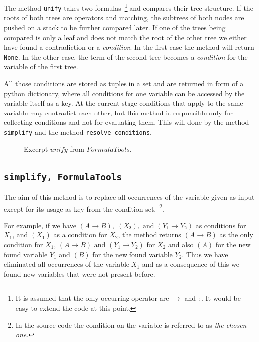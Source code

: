 The method \texttt{unify} takes two formulas~\footnote{It is assumed that the only occurring operator are $\rightarrow$ and $:$. It would be easy to extend the code at this point.} and compares their tree structure. If the roots of both trees are operators and matching, the subtrees of both nodes are pushed on a stack to be further compared later. If one of the trees being compared is only a leaf and does not match the root of the other tree we either have found a contradiction or a \emph{condition}. In the first case the method will return \texttt{None}. In the other case, the term of the second tree becomes a \emph{condition} for the variable of the first tree.

All those conditions are stored as tuples in a set and are returned in form of a python dictionary, where all conditions for one variable can be accessed by the variable itself as a key. At the current stage conditions that apply to the same variable may contradict each other, but this method is responsible only for collecting conditions and not for evaluating them. This will done by the method \texttt{simplify} and the method \texttt{resolve\_conditions}.

\begin{figure}[H]
	\vspace{-10pt}
	
	\vspace{-10pt}
	\caption{Excerpt $unify$ from $FormulaTools$.}
\end{figure}


\subsection[simplify]{\texttt{simplify, FormulaTools}}

The aim of this method is to replace all occurrences of the variable given as input except for its usage as key from the condition set.~\footnote{In the source code the condition on the variable is referred to as \emph{the chosen one}.}. 

For example, if we have $ (A \rightarrow B),\; (X_2),\; \text{and } (Y_1 \rightarrow Y_2)$ as conditions for $X_1$, and $(X_1)$ as a condition for $X_2$, the method returns $(A \rightarrow B)$ as the only condition for $X_1$, $(A \rightarrow B) \text{ and } (Y_1 \rightarrow Y_2)$ for $X_2$ and also $(A)$ for the new found variable $Y_1$ and $(B)$ for the new found variable $Y_2$. Thus we have eliminated all occurrences of the variable $X_1$ and as a consequence of this we found new variables that were not present before.

